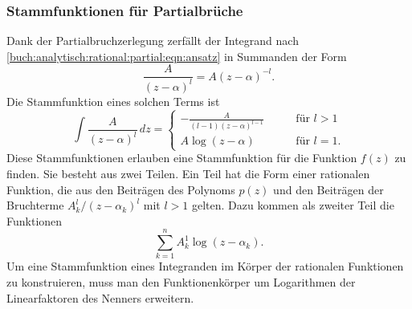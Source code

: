 \subsubsection{Stammfunktionen für Partialbrüche}
Dank der Partialbruchzerlegung zerfällt der Integrand nach
\eqref{buch:analytisch:rational:partial:eqn:ansatz}
in Summanden der Form
%
\[
\frac{A}{(z-\alpha)^l}
=
A(z-\alpha)^{-l}.
\]
Die Stammfunktion eines solchen Terms ist
\begin{equation}
\int \frac{A}{(z-\alpha)^l} \,dz
=
\begin{cases}
\displaystyle
-\frac{A}{(l-1)(z-\alpha)^{l-1}}
&\qquad\text{für $l>1$}
\\[10pt]
A\log(z-\alpha)
&\qquad\text{für $l=1$.}
\end{cases}
\label{buch:ratint:bernoulli:partial:eqn:stammfunktionen}
\end{equation}
Diese Stammfunktionen erlauben eine Stammfunktion für die
Funktion $f(z)$ zu finden.
Sie besteht aus zwei Teilen.
Ein Teil hat die Form einer rationalen Funktion, die aus den
Beiträgen des Polynoms $p(z)$ und den Beiträgen der
Bruchterme $A_k^l/(z-\alpha_k)^l$ mit $l>1$ gelten.
Dazu kommen als zweiter Teil die Funktionen
\[
\sum_{k=1}^n A_k^1\log(z-\alpha_k).
\]
Um eine Stammfunktion eines Integranden im Körper der rationalen Funktionen
zu konstruieren, muss man den Funktionenkörper um Logarithmen der
Linearfaktoren des Nenners erweitern.


